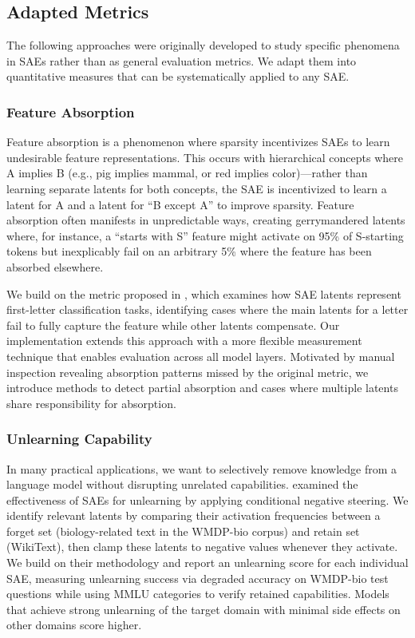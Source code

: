 \documentclass{article}
\theoremstyle{plain}
\theoremstyle{definition}
\theoremstyle{remark}
\begin{document}
\subsection{Adapted Metrics}

The following approaches were originally developed to study specific phenomena in SAEs rather than as general evaluation metrics. We adapt them into quantitative measures that can be systematically applied to any SAE. 

\subsubsection{Feature Absorption}

Feature absorption \cite{chanin2024absorptionstudyingfeaturesplitting} is a phenomenon where sparsity incentivizes SAEs to learn undesirable feature representations. This occurs with hierarchical concepts where A implies B (e.g., pig implies mammal, or red implies color)—rather than learning separate latents for both concepts, the SAE is incentivized to learn a latent for A and a latent for ``B except A'' to improve sparsity. Feature absorption often manifests in unpredictable ways, creating gerrymandered latents where, for instance, a ``starts with S'' feature might activate on 95\% of S-starting tokens but inexplicably fail on an arbitrary 5\% where the feature has been absorbed elsewhere. 

We build on the metric proposed in \citet{chanin2024absorptionstudyingfeaturesplitting}, which examines how SAE latents represent first-letter classification tasks, identifying cases where the main latents for a letter fail to fully capture the feature while other latents compensate. Our implementation extends this approach with a more flexible measurement technique that enables evaluation across all model layers. Motivated by manual inspection revealing absorption patterns missed by the original metric, we introduce methods to detect partial absorption and cases where multiple latents share responsibility for absorption.

\subsubsection{Unlearning Capability}
In many practical applications, we want to selectively remove knowledge from a language model without disrupting unrelated capabilities. \citet{farrell2024applyingsparseautoencodersunlearn} examined the effectiveness of SAEs for unlearning by applying conditional negative steering. We identify relevant latents by comparing their activation frequencies between a forget set (biology-related text in the WMDP-bio corpus) and retain set (WikiText), then clamp these latents to negative values whenever they activate. We build on their methodology and report an unlearning score for each individual SAE, measuring unlearning success via degraded accuracy on WMDP-bio test questions while using MMLU categories to verify retained capabilities. Models that achieve strong unlearning of the target domain with minimal side effects on other domains score higher.
\end{document}
